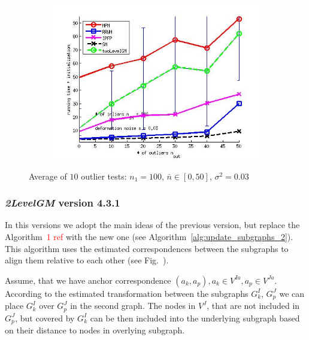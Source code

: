 \documentclass[
	fontsize=12pt,
	paper=a4,
	twoside=false,
	numbers=noenddot,
	plainheadsepline,
	toc=listof,
	toc=bibliography
]{scrartcl}
\newcommand\ToDo[1]{\textcolor{red}{#1}}
\begin{document}
\begin{figure}[h]
\begin{subfigure}[b]{0.3\textwidth}
		\includegraphics[scale=0.25]{"fig_ver2608/syntheticPointSets/ver4.3/outliertest_n50/time_summary_avg10t"} 
	\end{subfigure} 	
	\caption{Average of $10$ outlier tests: $n_1=100$, $\bar{n}\in[0,50]$, $\sigma^2=0.03$}
	\label{fig:test3_ver43}
\end{figure}

\FloatBarrier

\subsubsection{\emph{2LevelGM} version 4.3.1}

In this versions we adopt the main ideas of the previous version, but replace the Algorithm~\ToDo{1 ref} with the new one (see Algorithm~\ref*{alg:update_subgraphs_2}). This algorithm uses the estimated correspondences between the subgraphs to align them relative to each other (see Fig.~\ToDo{}).

Assume, that we have anchor correspondence $(a_k,a_p), a_k\in V^{Ia}, a_p\in V^{Ja}$. According to the estimated transformation between the subgraphs $G_k^I$, $G_p^J$ we can place $G_k^I$ over $G_p^J$ in the second graph. The nodes in $V^J$, that are not included in $G_p^J$, but covered by $G_k^I$ can be then  included into the underlying subgraph based on their distance to nodes in overlying subgraph.
\end{document}
